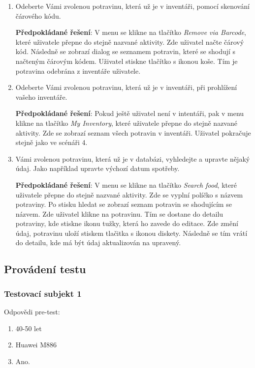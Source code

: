 \documentclass[thesis=B,czech]{FITthesis}[2013/10/20]
\begin{document}
\begin{enumerate}
  \item Odeberte Vámi zvolenou potravinu, která už je v inventáři, pomocí skenování čárového kódu.
    
    \textbf{Předpokládané řešení}: V menu se klikne na tlačítko \textit{Remove via Barcode}, které uživatele přepne do stejně nazvané aktivity. Zde uživatel načte čárový kód. Následně se zobrazí dialog se seznamem potravin, které se shodují s načteným čárovým kódem. Uživatel stiskne tlačítko s ikonou koše. Tím je potravina odebrána z inventáře uživatele.
  
  \item Odeberte Vámi zvolenou potravinu, která už je v inventáři, při prohlížení vašeho inventáře.
    
    \textbf{Předpokládané řešení}: Pokud ještě uživatel není v intentáři, pak v menu klikne na tlačítko \textit{My Inventory}, které uživatele přepne do stejně nazvané aktivity. Zde se zobrazí seznam všech potravin v inventáři. Uživatel pokračuje stejně jako ve scénáři 4.
  
  \item Vámi zvolenou potravinu, která už je v databázi, vyhledejte a upravte nějaký údaj. Jako například upravte výchozí datum spotřeby.
    
    \textbf{Předpokládané řešení}: V menu se klikne na tlačítko \textit{Search food}, které uživatele přepne do stejně nazvané aktivity. Zde se vyplní políčko s názvem potraviny. Po stisku hledat se zobrazí seznam potravin se shodujícím se názvem. Zde uživatel klikne na potravinu. Tím se dostane do detailu potraviny, kde stiskne ikonu tužky, která ho zavede do editace. Zde změní údaj, potravinu uloží stiskem tlačitka s ikonou diskety. Následně se tím vrátí do detailu, kde má být údaj aktualizován na upravený.
  
\end{enumerate}

\subsection{Provádení testu}

\subsubsection{Testovací subjekt 1}

Odpovědi pre-test:

\begin{enumerate}
  \item 40-50 let
  \item Huawei M886
  \item Ano.
\end{enumerate}
\end{document}
